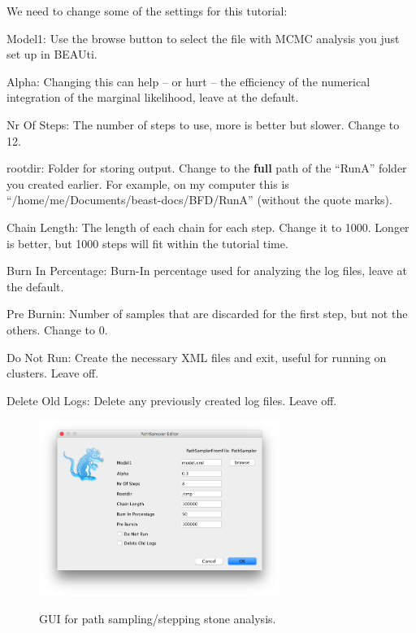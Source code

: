 {    	    

We need to change some of the settings for this tutorial:

    \begin{compactdesc}
       \item[Model1:]{Use the browse button to select the file with MCMC analysis you just set up in BEAUti.}
       \item[Alpha:]{Changing this can help -- or hurt -- the efficiency of the numerical integration of the marginal likelihood, leave at the default.}
       \item[Nr Of Steps:]{The number of steps to use, more is better but slower. Change to 12.}
       \item[rootdir:]{Folder for storing output. Change to the \textbf{full} path of the ``RunA'' folder you created earlier. For example, on my computer this is ``/home/me/Documents/beast-docs/BFD/RunA'' (without the quote marks).}
       \item[Chain Length:]{The length of each chain for each step. Change it to 1000. Longer is better, but 1000 steps will fit within the tutorial time.}
       \item[Burn In Percentage:]{Burn-In percentage used for analyzing the log files, leave at the default.}
       \item[Pre Burnin:]{Number of samples that are discarded for the first step, but not the others. Change to 0.}
       \item[Do Not Run:]{Create the necessary XML files and exit, useful for running on clusters. Leave off.}
       \item[Delete Old Logs:]{Delete any previously created log files. Leave off.}
    \end{compactdesc}

    \begin{figure}[htbp]
        \centering
        {\includegraphics[width=0.7\textwidth]{screenshots/pathsampler}}
        \caption{GUI for path sampling/stepping stone analysis.}
        \label{fig:pathsampler}
    \end{figure}

}
